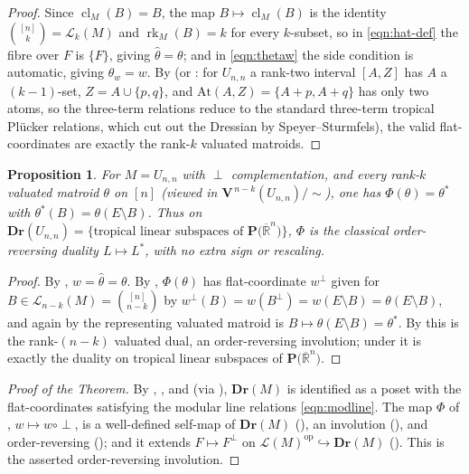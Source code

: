 \documentclass{article}
\newtheorem{proposition}[theorem]{Proposition}
\theoremstyle{definition}
\newcommand{\Rbar}{\overline{\mathbb{R}}}
\newcommand{\rk}{\operatorname{rk}}
\newcommand{\cl}{\operatorname{cl}}
\newcommand{\op}{\operatorname{op}}
\newcommand{\into}{\hookrightarrow}
\newcommand{\Dr}{\mathbf{Dr}}
\newcommand{\bV}{\mathbf V}
\newcommand{\cLL}{\mathcal{L}}
\newcommand{\PT}[1]{\mathbf{P}\big(\Rbar^{#1}\big)}
\begin{document}
\begin{proof}
Since $\cl_M(B)=B$, the map $B\mapsto\cl_M(B)$ is the identity $\binom{[n]}{k}=\cLL_k(M)$ and
$\rk_M(B)=k$ for every $k$-subset, so in \eqref{eqn:hat-def} the fibre over $F$ is $\{F\}$, giving
$\widehat\theta=\theta$; and in \eqref{eqn:thetaw} the side condition is automatic, giving
$\theta_w=w$. By  (or : for $U_{n,n}$ a rank-two interval
$[A,Z]$ has $A$ a $(k-1)$-set, $Z=A\cup\{p,q\}$, and $\mathrm{At}(A,Z)=\{A+p,A+q\}$ has only two
atoms, so the three-term relations reduce to the standard three-term tropical Pl\"ucker relations,
which cut out the Dressian by Speyer--Sturmfels), the valid flat-coordinates are exactly the rank-$k$
valuated matroids.
\end{proof}

\begin{proposition}\label{prop:Unn-agree}
For $M=U_{n,n}$ with $\perp$ complementation, and every rank-$k$ valuated matroid $\theta$ on $[n]$
(viewed in $\bV^{\,n-k}(U_{n,n})/\!\sim$), one has $\Phi(\theta)=\theta^{*}$ with $\theta^{*}(B)=
\theta(E\setminus B)$. Thus on $\Dr(U_{n,n})=\{\text{tropical linear subspaces of }\PT{n}\}$, $\Phi$
is the classical order-reversing duality $L\mapsto L^{*}$, with no extra sign or rescaling.
\end{proposition}

\begin{proof}
By , $w=\widehat\theta=\theta$. By , $\Phi(\theta)$ has
flat-coordinate $w^{\perp}$ given for $B\in\cLL_{n-k}(M)=\binom{[n]}{n-k}$ by
$w^{\perp}(B)=w(B^{\perp})=w(E\setminus B)=\theta(E\setminus B)$, and again by
 the representing valuated matroid is $B\mapsto\theta(E\setminus B)=\theta^{*}$.
By  this is the rank-$(n-k)$ valuated dual, an order-reversing involution; under
 it is exactly the duality on tropical linear subspaces of $\PT{n}$.
\end{proof}

\begin{proof}[Proof of the Theorem]
By , , and  (via ),
$\Dr(M)$ is identified as a poset with the flat-coordinates satisfying the modular line relations
\eqref{eqn:modline}. The map $\Phi$ of , $w\mapsto w\circ\perp$, is a well-defined
self-map of $\Dr(M)$ (), an involution (), and order-reversing
(); and it extends $F\mapsto F^{\perp}$ on $\cLL(M)^{\op}\into\Dr(M)$ ().
This is the asserted order-reversing involution.
\end{proof}
\end{document}
